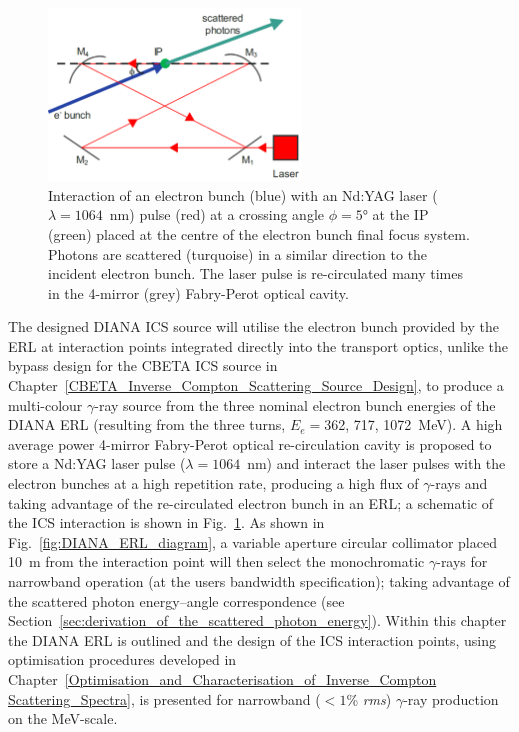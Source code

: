 \documentclass[../main.tex]{subfiles}
\begin{document}
\begin{figure}[!h]
\centering
\includegraphics[width=0.6\textwidth]{Figures/DIANA_Inverse_Compton_Source_Design/DIANA_interaction_fixed.pdf}
\caption{Interaction of an electron bunch (blue) with an Nd:YAG laser ($\lambda = 1064$~\si{\nano\meter}) pulse (red) at a crossing angle $\phi=5$\si{\degree} at the IP (green) placed at the centre of the electron bunch final focus system. Photons are scattered (turquoise) in a similar direction to the incident electron bunch. The laser pulse is re-circulated many times in the 4-mirror (grey) Fabry-Perot optical cavity.    }
\label{fig:DIANA_interaction}
\end{figure}
The designed DIANA ICS source will utilise the electron bunch provided by the ERL at interaction points integrated directly into the transport optics, unlike the bypass design for the CBETA ICS source in Chapter~\ref{CBETA_Inverse_Compton_Scattering_Source_Design}, to produce a multi-colour $\gamma$-ray source from the three nominal electron bunch energies of the DIANA ERL (resulting from the three turns, $E_{e}=$362, 717, 1072~\si{\mega\electronvolt}). A high average power 4-mirror Fabry-Perot optical re-circulation cavity is proposed to store a Nd:YAG laser pulse ($\lambda = 1064$~\si{\nano\meter}) and interact the laser pulses with the electron bunches at a high repetition rate, producing a high flux of $\gamma$-rays and taking advantage of the re-circulated electron bunch in an ERL; a schematic of the ICS interaction is shown in Fig.~\ref{fig:DIANA_interaction}. As shown in Fig.~\ref{fig:DIANA_ERL_diagram}, a variable aperture circular collimator placed 10~\si{\meter} from the interaction point will then select the monochromatic $\gamma$-rays for narrowband operation (at the users bandwidth specification); taking advantage of the scattered photon energy--angle correspondence (see Section~\ref{sec:derivation_of_the_scattered_photon_energy}). Within this chapter the DIANA ERL is outlined and the design of the ICS interaction points, using optimisation procedures developed in Chapter~\ref{Optimisation_and_Characterisation_of_Inverse_Compton Scattering_Spectra}, is presented for narrowband ($< 1$\% \textit{rms}) $\gamma$-ray production on the \si{\mega\electronvolt}-scale. 
\end{document}

